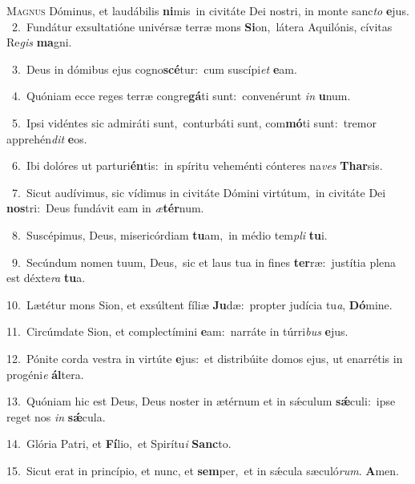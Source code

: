 \lettrine{\initial\textcolor{\initialcolor}{M}}{agnus} Dóminus, et laudábilis \textbf{ni}\-mis~\star in civitáte Dei nostri, in monte sanc\textit{to} \textbf{e}\-jus.\\
{\numbfont\textcolor{\numbcolor}{~2.}}~Fundátur exsultatióne univérsæ terræ mons \textbf{Si}\-on,~\star látera Aquilónis, cívitas Re\textit{gis} \textbf{ma}\-gni.\par
{\numbfont\textcolor{\numbcolor}{~3.}}~Deus in dómibus ejus cogno\-\textbf{scé}\-tur:~\star cum suscípi\textit{et} \textbf{e}\-am.\par
{\numbfont\textcolor{\numbcolor}{~4.}}~Quóniam ecce reges terræ congre\-\textbf{gá}\-ti sunt:~\star convenérunt \textit{in} \textbf{u}\-num.\par
{\numbfont\textcolor{\numbcolor}{~5.}}~Ipsi vidéntes sic admiráti sunt,~\dagger conturbáti sunt, com\-\textbf{mó}\-ti sunt:~\star tremor apprehén\textit{dit} \textbf{e}\-os.\par
{\numbfont\textcolor{\numbcolor}{~6.}}~Ibi dolóres ut parturi\-\textbf{én}\-tis:~\star in spíritu veheménti cónteres na\textit{ves} \textbf{Thar}\-sis.\par
{\numbfont\textcolor{\numbcolor}{~7.}}~Sicut audívimus, sic vídimus in civitáte Dómini virtútum,~\dagger in civitáte Dei \textbf{nos}\-tri:~\star Deus fundávit eam in \textit{æ}\-\textbf{tér}num.\par
{\numbfont\textcolor{\numbcolor}{~8.}}~Suscépimus, Deus, misericórdiam \textbf{tu}\-am,~\star in médio tem\textit{pli} \textbf{tu}\-i.\par
{\numbfont\textcolor{\numbcolor}{~9.}}~Secúndum nomen tuum, Deus,~\dagger sic et laus tua in fines \textbf{ter}\-ræ:~\star justítia plena est déxte\textit{ra} \textbf{tu}\-a.\par
{\numbfont\textcolor{\numbcolor}{10.}}~Lætétur mons Sion, et exsúltent fíliæ \textbf{Ju}\-dæ:~\star propter judícia tu\-\textit{a}\-, \textbf{Dó}\-mine.\par
{\numbfont\textcolor{\numbcolor}{11.}}~Circúmdate Sion, et complectímini \textbf{e}\-am:~\star narráte in túrri\textit{bus} \textbf{e}\-jus.\par
{\numbfont\textcolor{\numbcolor}{12.}}~Pónite corda vestra in virtúte \textbf{e}\-jus:~\star et distribúite domos ejus, ut enarrétis in progéni\textit{e} \textbf{ál}\-tera.\par
{\numbfont\textcolor{\numbcolor}{13.}}~Quóniam hic est Deus, Deus noster in ætérnum et in sǽculum \textbf{sǽ}\-culi:~\star ipse reget nos \textit{in} \textbf{sǽ}\-cula.\par
{\numbfont\textcolor{\numbcolor}{14.}}~Glória Patri, et \textbf{Fí}\-lio,~\star et Spirítu\textit{i} \textbf{Sanc}\-to.\par
{\numbfont\textcolor{\numbcolor}{15.}}~Sicut erat in princípio, et nunc, et \textbf{sem}\-per,~\star et in sǽcula sæculó\-\textit{rum}\-. \textbf{A}\-men.\par
